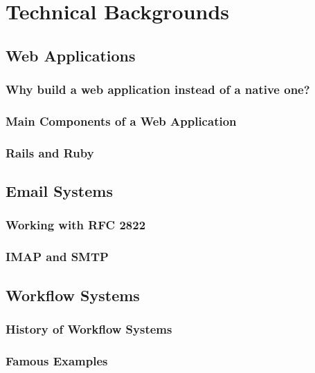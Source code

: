 \chapter{Technical Backgrounds}
\label{chapter:Technical}

\section{Web Applications}
\subsection{Why build a web application instead of a native one?}
\subsection{Main Components of a Web Application}
\subsection{Rails and Ruby}

\section{Email Systems}
\subsection{Working with RFC 2822}
\subsection{IMAP and SMTP}

\section{Workflow Systems}
\subsection{History of Workflow Systems}
\subsection{Famous Examples}
